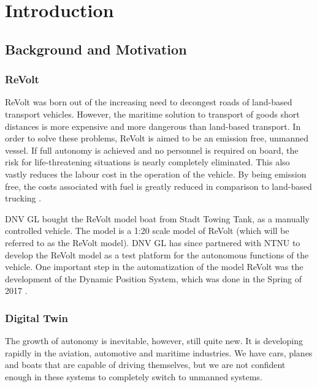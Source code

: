 \chapter{Introduction}

\section{Background and Motivation}

\subsection{ReVolt}
ReVolt was born out of the increasing need to decongest roads of land-based transport vehicles. However, the maritime solution to transport of goods short distances is more expensive and more dangerous than land-based transport. In order to solve these problems, ReVolt is aimed to be an emission free, unmanned vessel. If full autonomy is achieved and no personnel is required on board, the risk for life-threatening situations is nearly completely eliminated. This also vastly reduces the labour cost in the operation of the vehicle. By being emission free, the costs associated with fuel is greatly reduced in comparison to land-based trucking \cite{dnvglRevolt}.

DNV GL bought the ReVolt model boat from Stadt Towing Tank, as a manually controlled vehicle. The model is a 1:20 scale model of ReVolt (which will be referred to as the ReVolt model). DNV GL has since partnered with NTNU to develop the ReVolt model as a test platform for the autonomous functions of the vehicle. One important step in the automatization of the model ReVolt was the development of the Dynamic Position System, which was done in the Spring of 2017 .


\subsection{Digital Twin}
The growth of autonomy is inevitable, however, still quite new. It is developing rapidly in the aviation, automotive and maritime industries. We have cars, planes and boats that are capable of driving themselves, but we are not confident enough in these systems to completely switch to unmanned systems.

